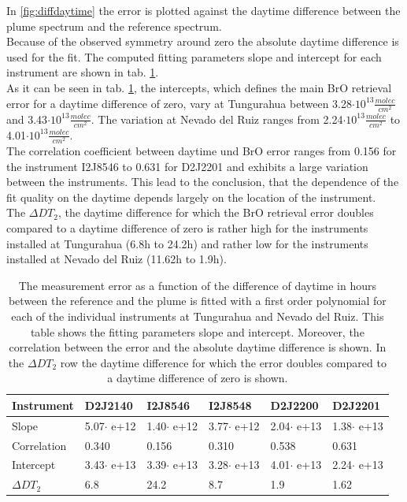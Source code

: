 In \cref{fig:diffdaytime} the  error is plotted against the daytime difference between the plume spectrum and the reference spectrum.  \\
Because of the observed symmetry around zero the absolute daytime difference is used for the fit. The computed fitting parameters slope and intercept for each instrument are shown in tab. \ref{tab:dtcalc}. \\
%
As it can be seen in tab. \ref{tab:dtcalc}, the intercepts, which defines the main BrO retrieval error for a daytime difference of zero, vary at Tungurahua between 3.28$\cdot10^{13}\frac{molec}{cm^2}$ and 3.43$\cdot10^{13}\frac{molec}{cm^2}$. The variation at Nevado del Ruiz ranges from  2.24$\cdot10^{13}\frac{molec}{cm^2}$ to 4.01$\cdot10^{13}\frac{molec}{cm^2}$. \\
The correlation coefficient between daytime und BrO error 
ranges from 0.156 for the instrument I2J8546 to  0.631 for D2J2201 and exhibits a large variation between the instruments. This lead to the conclusion, that the dependence of the fit quality on the daytime depends largely on the location of the instrument.\\
The $\Delta DT_{2}$, the daytime difference for which the BrO retrieval error doubles compared to a daytime difference of zero is rather high for the instruments installed at Tungurahua (6.8h to 24.2h) and rather low for the instruments installed at Nevado del Ruiz (11.62h to 1.9h).

\begin{table}[h]
	\centering
	\begin{tabular}{|p{2cm}|p{2.15cm}|p{2.15cm}|p{2.15cm}|p{2.15cm}|p{2.15cm}|}
		Instrument	&D2J2140&I2J8546& I2J8548&D2J2200&D2J2201\\
		\toprule
		Slope&5.07$\cdot$ e+12&1.40$\cdot$ e+12 &3.77$\cdot$ e+12 &2.04$\cdot$ e+13& 1.38$\cdot$ e+13\\
		\midrule
		Correlation&
		0.340&
		0.156&
		0.310&
		0.538&
		0.631\\
		\midrule
		Intercept& 3.43$\cdot$ e+13&3.39$\cdot$ e+13&3.28$\cdot$ e+13&  4.01$\cdot$ e+13&  2.24$\cdot$ e+13\\
		\midrule
		$\Delta DT_{2}$&6.8&24.2&8.7&1.9&1.62\\
		\bottomrule
	\end{tabular}
	\label{tab:dtcalc}
	\caption{The  measurement error as a function of the difference of daytime in hours between the reference and the plume is fitted with a first order polynomial for each of the individual instruments at Tungurahua and Nevado del Ruiz. This table shows the fitting parameters slope and intercept. Moreover, the correlation between the  error and the absolute daytime difference is shown. In the $\Delta DT_{2}$ row the daytime difference for which the error doubles compared to a daytime difference of zero is shown.}
\end{table}

